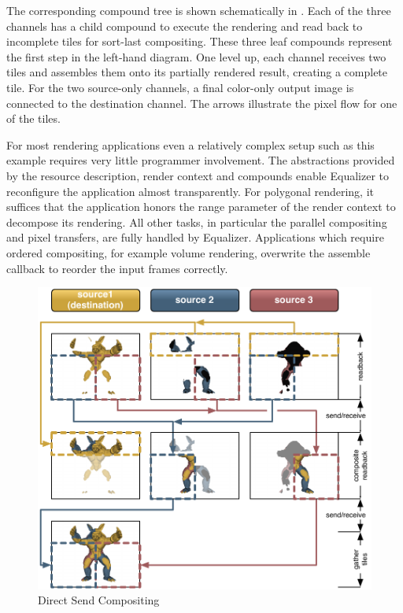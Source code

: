 The corresponding compound tree is shown schematically in .
Each of the three channels has a child compound to execute the rendering and
read back to incomplete tiles for sort-last compositing. These three leaf
compounds represent the first step in the left-hand diagram. One level up, each
channel receives two tiles and assembles them onto its partially rendered
result, creating a complete tile. For the two source-only channels, a final
color-only output image is connected to the destination channel. The arrows
illustrate the pixel flow for one of the tiles.

For most rendering applications even a relatively complex setup such as this
example requires very little programmer involvement. The abstractions provided
by the resource description, render context and compounds enable Equalizer to
reconfigure the application almost transparently. For polygonal rendering, it
suffices that the application honors the \textsf{range} parameter of the render
context to decompose its rendering. All other tasks, in particular the parallel
compositing and pixel transfers, are fully handled by Equalizer. Applications
which require ordered compositing, for example volume rendering, overwrite the
assemble callback to reorder the input frames correctly.

\begin{figure}[h!t]
  \includegraphics[width=\textwidth]{images/directSend}
  {\caption{\label{fDirectSend}Direct Send Compositing}}
\end{figure}

